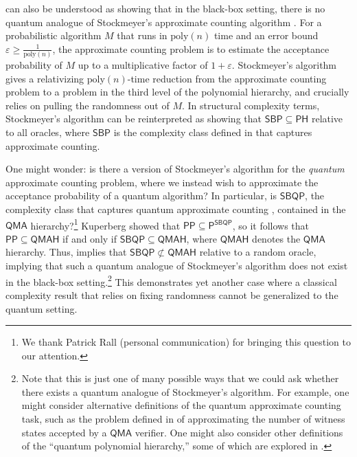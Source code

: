 \documentclass[10pt,a4paper]{article}
\newcommand{\eps}{\varepsilon}
\newcommand{\poly}{\mathrm{poly}}
\begin{document}
 can also be understood as showing that in the black-box setting, there is no quantum analogue of Stockmeyer's approximate counting algorithm \cite{Sto83}. For a probabilistic algorithm $M$ that runs in $\poly(n)$ time and an error bound $\eps \ge \frac{1}{\poly(n)}$, the approximate counting problem is to estimate the acceptance probability of $M$ up to a multiplicative factor of $1 + \eps$. Stockmeyer's algorithm \cite{Sto83} gives a relativizing $\poly(n)$-time reduction from the approximate counting problem to a problem in the third level of the polynomial hierarchy, and crucially relies on pulling the randomness out of $M$. In structural complexity terms, Stockmeyer's algorithm can be reinterpreted as showing that $\mathsf{SBP} \subseteq \mathsf{PH}$ relative to all oracles, where $\mathsf{SBP}$ is the complexity class defined in \cite{BGM05} that captures approximate counting.

One might wonder: is there a version of Stockmeyer's algorithm for the \textit{quantum} approximate counting problem, where we instead wish to approximate the acceptance probability of a quantum algorithm? In particular, is $\mathsf{SBQP}$, the complexity class that captures quantum approximate counting \cite{Kup15}, contained in the $\mathsf{QMA}$ hierarchy?\footnote{We thank Patrick Rall (personal communication) for bringing this question to our attention.} Kuperberg \cite{Kup15} showed that $\mathsf{PP} \subseteq \mathsf{P}^\mathsf{SBQP}$, so it follows that $\mathsf{PP} \subseteq \mathsf{QMAH}$ if and only if $\mathsf{SBQP} \subseteq \mathsf{QMAH}$, where $\mathsf{QMAH}$ denotes the $\mathsf{QMA}$ hierarchy. Thus,  implies that $\mathsf{SBQP} \not\subset \mathsf{QMAH}$ relative to a random oracle, implying that such a quantum analogue of Stockmeyer's algorithm does not exist in the black-box setting.\footnote{Note that this is just one of many possible ways that we could ask whether there exists a quantum analogue of Stockmeyer's algorithm. For example, one might consider alternative definitions of the quantum approximate counting task, such as the problem defined in \cite{BCGW21} of approximating the number of witness states accepted by a $\mathsf{QMA}$ verifier. One might also consider other definitions of the ``quantum polynomial hierarchy,'' some of which are explored in \cite{GSS+18}.} This demonstrates yet another case where a classical complexity result that relies on fixing randomness cannot be generalized to the quantum setting.
\end{document}
